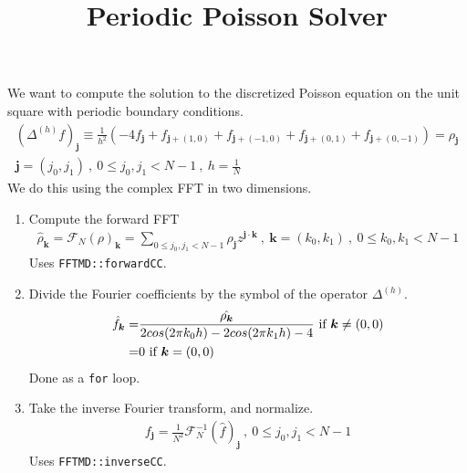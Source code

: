\documentclass[11pt]{article}
\title{Periodic Poisson Solver}
\newcommand{\jbold}{{\boldsymbol{j}}}
\newcommand{\kbold}{{\boldsymbol{k}}}
\begin{document}
\maketitle
\noindent
We want to compute the solution to the discretized Poisson equation on the unit square with periodic boundary conditions.
\begin{gather*}
(\Delta^{(h)} f)_\jbold \equiv  \frac{1}{h^2} (-4 f_\jbold + f_{\jbold + (1,0)} + f_{\jbold + (-1,0)} + f_{\jbold + (0,1)} +f_{\jbold + (0,-1)}) = \rho_\jbold\\ 
\jbold = (j_0,j_1) ~,~ 0 \leq j_0,j_1 < N-1 ~,~ h = \frac{1}{N}
\end{gather*}
We do this using the complex FFT in two dimensions.
\begin{enumerate}
\item
Compute the forward FFT
\begin{gather*}
\hat{\rho}_\kbold = \mathcal{F}_N(\rho)_\kbold = \sum \limits_{0 \leq j_0,j_1 < N-1} \rho_{\jbold} z^{\jbold \cdot \kbold} ~,~ \kbold = (k_0,k_1) ~,~ 0 \leq k_0,k_1 < N-1
\end{gather*}
Uses {\tt FFTMD::forwardCC}.
\item
Divide the Fourier coefficients by the symbol of the operator $\Delta^{(h)}$.
\begin{align*}
\hat{f}_\kbold = &  \frac{\hat{\rho_\kbold}}{2cos(2 \pi k_0 h) - 2 cos(2 \pi k_1 h) - 4} \hbox{ if } \kbold \neq (0,0)
\\ = & 0 \hbox{ if } \kbold = (0,0)
\end{align*}
Done as a {\tt for} loop.
\item
Take the inverse Fourier transform, and normalize.
\begin{gather*}
f_\jbold = \frac{1}{N^2}\mathcal{F}_N^{-1}(\hat{f})_\jbold ~,~ 0 \leq j_0,j_1 < N-1
\end{gather*}
Uses {\tt FFTMD::inverseCC}.
\end{enumerate}
\end{document}
